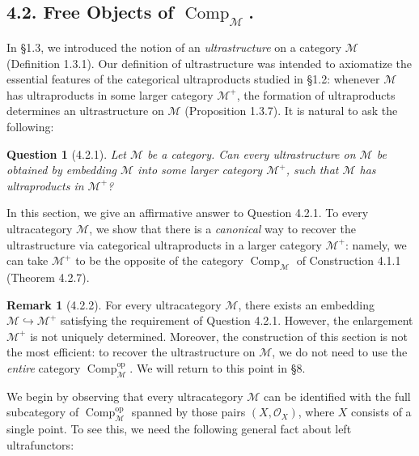 \documentclass[11pt]{article}
\theoremstyle{plain}
\newtheorem{question}{Question}
\theoremstyle{definition}
\newtheorem{remark}{Remark}
\newcommand{\Comp}{\operatorname{Comp}}
\begin{document}


\subsection*{4.2. Free Objects of $\Comp_{\mathcal{M}}$.}

In \S 1.3, we introduced the notion of an \emph{ultrastructure} on a category $\mathcal{M}$ (Definition 1.3.1). Our definition of ultrastructure was intended to axiomatize the essential features of the categorical ultraproducts studied in \S 1.2: whenever $\mathcal{M}$ has ultraproducts in some larger category $\mathcal{M}^{+}$, the formation of ultraproducts determines an ultrastructure on $\mathcal{M}$ (Proposition 1.3.7). It is natural to ask the following:

\begin{question}[4.2.1]
Let $\mathcal{M}$ be a category. Can every ultrastructure on $\mathcal{M}$ be obtained by embedding $\mathcal{M}$ into some larger category $\mathcal{M}^{+}$, such that $\mathcal{M}$ has ultraproducts in $\mathcal{M}^{+}$?
\end{question}

In this section, we give an affirmative answer to Question 4.2.1. To every ultracategory $\mathcal{M}$, we show that there is a \emph{canonical} way to recover the ultrastructure via categorical ultraproducts in a larger category $\mathcal{M}^{+}$: namely, we can take $\mathcal{M}^{+}$ to be the opposite of the category $\Comp_{\mathcal{M}}$ of Construction 4.1.1 (Theorem 4.2.7).

\begin{remark}[4.2.2]
For every ultracategory $\mathcal{M}$, there exists an embedding $\mathcal{M} \hookrightarrow \mathcal{M}^{+}$ satisfying the requirement of Question 4.2.1. However, the enlargement $\mathcal{M}^{+}$ is not uniquely determined. Moreover, the construction of this section is not the most efficient: to recover the ultrastructure on $\mathcal{M}$, we do not need to use the \emph{entire} category $\Comp^{\mathrm{op}}_{\mathcal{M}}$. We will return to this point in \S 8.
\end{remark}

We begin by observing that every ultracategory $\mathcal{M}$ can be identified with the full subcategory of $\Comp^{\mathrm{op}}_{\mathcal{M}}$ spanned by those pairs $(X, \mathcal{O}_X)$, where $X$ consists of a single point. To see this, we need the following general fact about left ultrafunctors:
\end{document}
